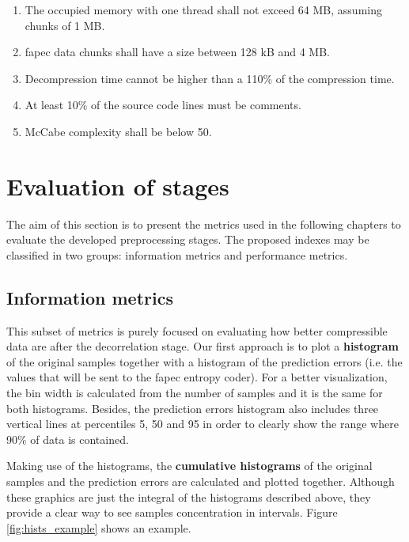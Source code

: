 \begin{enumerate}
	\item The occupied memory with one thread shall not exceed 64 MB, assuming chunks of 1 MB.
	\item \acrshort{fapec} data chunks shall have a size between 128 kB and 4 MB. \label{spec:chunk_size}
	\item Decompression time cannot be higher than a 110\% of the compression time.
	\item At least 10\% of the source code lines must be comments.
	\item McCabe complexity \parencite{mccabe} shall be below 50.
\end{enumerate}

\section{Evaluation of stages} \label{sec:metrics}
The aim of this section is to present the metrics used in the following chapters to evaluate the developed preprocessing stages. The proposed indexes may be classified in two groups: information metrics and performance metrics.

\subsection{Information metrics} \label{sec:information_metrics}
This subset of metrics is purely focused on evaluating how better compressible data are after the decorrelation stage. Our first approach is to plot a \textbf{histogram} of the original samples together with a histogram of the prediction errors (i.e. the values that will be sent to the \acrshort{fapec} entropy coder). For a better visualization, the bin width is calculated from the number of samples and it is the same for both histograms. Besides, the prediction errors histogram also includes three vertical lines at percentiles 5, 50 and 95 in order to clearly show the range where 90\% of data is contained.

Making use of the histograms, the \textbf{cumulative histograms} of the original samples and the prediction errors are calculated and plotted together. Although these graphics are just the integral of the histograms described above, they provide a clear way to see samples concentration in intervals. Figure \ref{fig:hists_example} shows an example.

